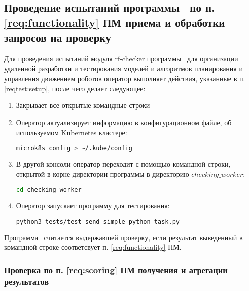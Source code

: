 \subsection{Проведение испытаний программы \productname\ по п. \ref{req:functionality} ПМ приема и обработки запросов на проверку} \label{reqtest:functionality}
Для проведения испытаний модуля rf-checker  программы \productname\ для организации удаленной разработки и тестирования моделей и алгоритмов планирования и управления движением роботов оператор выполняет действия, указанные в п. \ref{reqtest:setup}, после чего делает следующее:
\begin{enumerate}
    \item Закрывает все открытые командные строки
    \item Оператор актуализирует информацию в конфигурационном файле, об используемом Kubernetes кластере:
    \begin{lstlisting}[language=bash, numbers=none, frame=single]
        microk8s config > ~/.kube/config
    \end{lstlisting}
    \item В другой консоли оператор переходит с помощью командной строки, открытой в корне директории программы в директорию $checking\_worker$:
    \begin{lstlisting}[language=bash, numbers=none, frame=single]
    cd checking_worker
    \end{lstlisting}
    \item Оператор запускает программу для тестирования:
    \begin{lstlisting}[language=bash, numbers=none, frame=single]
    python3 tests/test_send_simple_python_task.py
    \end{lstlisting}
\end{enumerate}
Программа \programname\ считается выдержавшей проверку, если результат выведенный в командной строке соответсвует п. \ref{req:functionality} ПМ.


\subsubsection{Проверка по п. \ref{req:scoring} ПМ получения и агрегации результатов} \label{reqtest:scoring}

